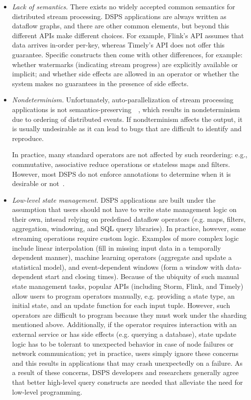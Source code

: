 \begin{itemize}
\item \emph{Lack of semantics.}
There exists no widely accepted common semantics for distributed stream processing.
DSPS applications are always written as dataflow graphs, and there are other common elements,
but beyond this different APIs make different choices.
For example, Flink's API
assumes that data arrives in-order per-key, whereas Timely's API does not offer this guarantee.
Specific constructs then come with other differences, for example: whether watermarks (indicating stream progress) are explicitly available or implicit;
and
whether side effects are allowed in an operator or whether the system makes no guarantees in the presence of side effects.

\item \emph{Nondeterminism.}
Unfortunately, auto-parallelization of stream processing applications
is not semantics-preserving~\cite{xiao2014nondeterminism,schneider2013safe,hirzel2014catalog}~,
which results in nondeterminism due to ordering of distributed events.
If nondterminism affects the output, it is usually undesirable as it can lead to bugs that are difficult to identify and reproduce.

In practice, many standard operators are not affected by such reordering: e.g.,
commutative, associative reduce operations or stateless maps and filters.
However, most DSPS do not enforce annotations to determine when it is desirable or not~\cite{schneider2013safe}.

\item \emph{Low-level state management.}
DSPS applications are built under the assumption that users should not have to
write state management logic on their own, intsead relying on predefined
dataflow operators (e.g. maps, filters, aggregation, windowing, and SQL query libraries).
In practice, however, some streaming operations require custom logic.
Examples of more complex logic include linear interpolation (fill in missing input data in a temporally dependent manner),
machine learning operators (aggregate and update a statistical model),
and event-dependent windows (form a window with data-dependent start and closing times).
Because of the ubiquity of such manual state management tasks,
popular APIs (including Storm, Flink, and Timely) allow users to program
operators manually, e.g. providing a state type, an initial state, and an
update function for each input tuple.
However, such operators are difficult to program because they must work under
the sharding mentioned above.
Additionally, if the operator requires interaction with an external service or has side effects (e.g. querying a database), state update logic has to be tolerant to unexpected behavior in case of node failures or network communication; yet in practice, users simply ignore these concerns and this results in applications that may crash unexpectedly on a failure.
As a result of these concerns, DSPS developers and researchers generally agree
that better high-level query constructs are needed that alleviate the need for low-level programming.


\end{itemize}
